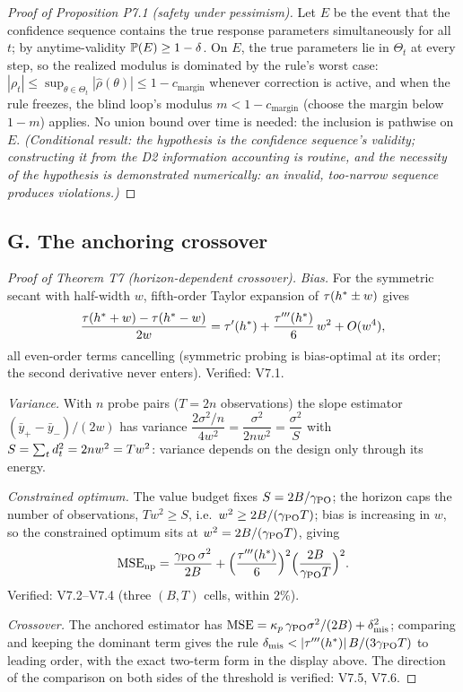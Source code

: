 \documentclass[11pt]{article}
\begin{document}
\begin{proof}[Proof of Proposition P7.1 (safety under pessimism)]
Let $E$ be the event that the confidence sequence contains the true
response parameters simultaneously for all $t$; by anytime-validity
$\mathbb{P}(E) \ge 1-\delta$. On $E$, the true parameters lie in $\Theta_t$ at
every step, so the realized modulus is dominated by the rule's worst case:
$|\rho_t| \le \sup_{\theta\in\Theta_t}|\hat\rho(\theta)| \le 1 -
c_{\mathrm{margin}}$ whenever correction is active, and when the rule
freezes, the blind loop's modulus $m < 1 - c_{\mathrm{margin}}$ (choose the
margin below $1 - m$) applies. No union bound over time is needed: the
inclusion is pathwise on $E$. \emph{(Conditional result: the hypothesis is
the confidence sequence's validity; constructing it from the D2
information accounting is routine, and the necessity of the hypothesis is
demonstrated numerically: an invalid, too-narrow sequence produces
violations.)}
\end{proof}

\subsection*{G. The anchoring crossover}

\begin{proof}[Proof of Theorem T7 (horizon-dependent crossover)]
\emph{Bias.} For the symmetric secant with half-width $w$, fifth-order
Taylor expansion of $\tau(h^{*} \pm w)$ gives
\[
\frac{\tau(h^{*} + w) - \tau(h^{*} - w)}{2w}
 = \tau'(h^{*}) + \frac{\tau'''(h^{*})}{6}\,w^2 + O(w^4),
\]
all even-order terms cancelling (symmetric probing is bias-optimal at its
order; the second derivative never enters). Verified: V7.1.

\emph{Variance.} With $n$ probe pairs ($T = 2n$ observations) the slope
estimator $(\bar y_+ - \bar y_-)/(2w)$ has variance
$\dfrac{2\sigma^2/n}{4w^2} = \dfrac{\sigma^2}{2nw^2} = \dfrac{\sigma^2}{S}$ with
$S = \sum_t d_t^2 = 2n w^2 = T w^2$: variance depends on the design only
through its energy.

\emph{Constrained optimum.} The value budget fixes $S = 2B/\gamma_{\mathrm{PO}}$; the
horizon caps the number of observations, $T w^2 \ge S$, i.e.\
$w^2 \ge 2B/(\gamma_{\mathrm{PO}} T)$; bias is increasing in $w$, so the constrained
optimum sits at $w^2 = 2B/(\gamma_{\mathrm{PO}} T)$, giving
\[
\mathrm{MSE}_{\mathrm{np}} = \frac{\gamma_{\mathrm{PO}}\,\sigma^2}{2B}
 + \Big(\frac{\tau'''(h^{*})}{6}\Big)^2\Big(\frac{2B}{\gamma_{\mathrm{PO}} T}\Big)^2 .
\]
Verified: V7.2--V7.4 (three $(B, T)$ cells, within $2\%$).

\emph{Crossover.} The anchored estimator has
$\mathrm{MSE} = \kappa_p\,\gamma_{\mathrm{PO}}\sigma^2/(2B) + \delta_{\mathrm{mis}}^2$;
comparing and keeping the dominant term gives the rule
$\delta_{\mathrm{mis}} < |\tau'''(h^{*})|\,B/(3\gamma_{\mathrm{PO}} T)$ to leading order,
with the exact two-term form in the display above. The direction of the
comparison on both sides of the threshold is verified: V7.5, V7.6.
\end{proof}
\end{document}
